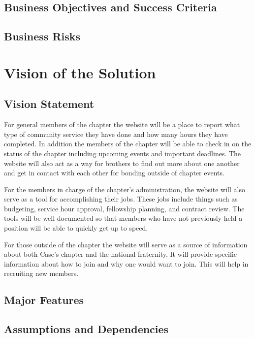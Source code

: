 \documentclass[11pt,letterpaper,rotate]{article}
\begin{document}
\subsection{Business Objectives and Success Criteria}


\subsection{Business Risks}


\section{Vision of the Solution}

\subsection{Vision Statement}

For general members of the chapter the website will be a place to report what type of community service they have done and how many hours they have completed. In addition the members of the chapter will be able to check in on the status of the chapter including upcoming events and important deadlines. The website will also act as a way for brothers to find out more about one another and get in contact with each other for bonding outside of chapter events.

For the members in charge of the chapter's administration, the website will also serve as a tool for accomplishing their jobs. These jobs include things such as budgeting, service hour approval, fellowship planning, and contract review. The tools will be well documented so that members who have not previously held a position will be able to quickly get up to speed.

For those outside of the chapter the website will serve as a source of information about both Case's chapter and the national fraternity. It will provide specific information about how to join and why one would want to join. This will help in recruiting new members.


\subsection{Major Features}


\subsection{Assumptions and Dependencies}
\end{document}
